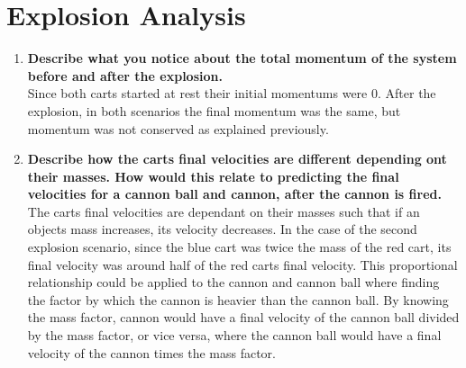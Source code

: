 \documentclass[12pt,letterpaper]{article}
\begin{document}
\section{Explosion Analysis}
\begin{enumerate}
	\item \textbf{Describe what you notice about the total momentum of the system before and after the explosion.}\\
	      Since both carts started at rest their initial momentums were 0.
	      After the explosion, in both scenarios the final momentum was the same, but momentum was not conserved as explained previously.
	\item \textbf{Describe how the carts final velocities are different depending ont their masses. How would this relate to predicting the final velocities for a cannon ball and cannon, after the cannon is fired.}\\
	      The carts final velocities are dependant on their masses such that if an objects mass increases, its velocity decreases.
	      In the case of the second explosion scenario, since the blue cart was twice the mass of the red cart, its final velocity was around half of the red carts final velocity.
	      This proportional relationship could be applied to the cannon and cannon ball where finding the factor by which the cannon is heavier than the cannon ball.
	      By knowing the mass factor, cannon would have a final velocity of the cannon ball divided by the mass factor, or vice versa, where the cannon ball would have a final velocity of the cannon times the mass factor.
\end{enumerate}
\end{document}

